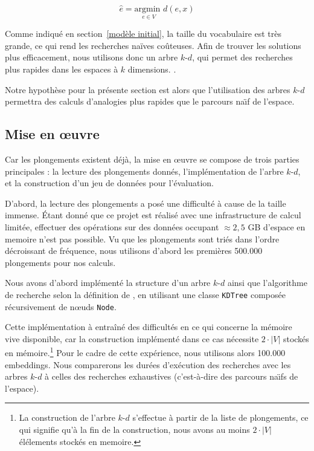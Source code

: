 \documentclass[12pt]{article}
\begin{document}
\begin{equation}\label{eq:dist}
    \hat{e} = \underset{e \in V}{\text{argmin }} d(e, x)
\end{equation}

Comme indiqué en section~\ref{modèle initial}, la taille du vocabulaire est très grande, ce qui rend les recherches naïves coûteuses. Afin de trouver les solutions plus efficacement, nous utilisons donc un arbre $k$-$d$, qui permet des recherches plus rapides dans les espaces à $k$ dimensions. \citep{bentley1975multidimensional}. 

Notre hypothèse pour la présente section est alors que l'utilisation des arbres $k$-$d$ permettra des calculs d'analogies plus rapides que le parcours na\"\i f de l'espace.

\subsection{Mise en œuvre} \label{mise en œuvre-2}

Car les plongements existent déjà, la mise en œuvre se compose de trois parties principales : la lecture des plongements donnés, l'implémentation de l'arbre $k$-$d$, et la construction d'un jeu de données pour l'évaluation.

D'abord, la lecture des plongements a posé une difficulté à cause de la taille immense. Étant donné que ce projet est réalisé avec une infrastructure de calcul limitée, effectuer des opérations sur des données occupant $\approx 2{,}5$ GB d'espace en memoire n'est pas possible. Vu que les plongements sont triés dans l'ordre décroissant de fréquence, nous utilisons d'abord les premières 500.000 plongements pour nos calculs.

Nous avons d'abord implémenté la structure d'un arbre $k$-$d$ ainsi que l'algorithme de recherche selon la définition de \cite{friedman1977algorithm}, en utilisant une classe \texttt{KDTree} composée récursivement de nœuds \texttt{Node}.

Cette implémentation à entraîné des difficultés en ce qui concerne la mémoire vive disponible, car la construction implémenté dans ce cas nécessite $2 \cdot |V|$ stockés en mémoire.\footnote{La construction de l'arbre $k$-$d$ s'effectue à partir de la liste de plongements, ce qui signifie qu'à la fin de la construction, nous avons au moins $2 \cdot |V|$ élélements stockés en memoire.} Pour le cadre de cette expérience, nous utilisons alors 100.000 embeddings. Nous comparerons les durées d'exécution des recherches avec les arbres $k$-$d$ à celles des recherches exhaustives (c'est-à-dire des parcours na\"\i fs de l'espace).
\end{document}
